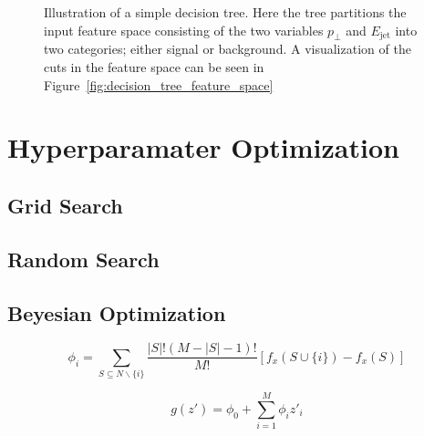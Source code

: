 \documentclass[a4paper, twoside, nobib]{tufte-book}
\begin{document}
\begin{figure}
  \centering
  \caption[Decision Tree Illustration]{
    Illustration of a simple decision tree. Here the tree partitions the input feature space consisting of the two variables $p_\perp$ and $E_\mathrm{jet}$ into two categories; either signal or background. A visualization of the cuts in the feature space can be seen in Figure~\ref{fig:decision_tree_feature_space}
  }
  \label{fig:tikz:decision_tree}
\end{figure}

\section{Hyperparamater Optimization}
\label{sec:ml:hyperparameter_optimization}

\subsection{Grid Search}
\label{subsec:ml:grid_search}

\subsection{Random Search}
\label{subsec:ml:random_search}

\subsection{Beyesian Optimization}
\label{subsec:ml:bayesian_optimization}



\newpage

$$\phi_i = \sum_{S \subseteq N \backslash \{i\}} \frac{|S|!(M-|S|-1)!}{M!} \left[ f_x(S \cup \{i\}) - f_x(S) \right]  $$

$$ g(z') = \phi_0 + \sum_{i=1}^{M} \phi_i {z'}_i $$
\end{document}
